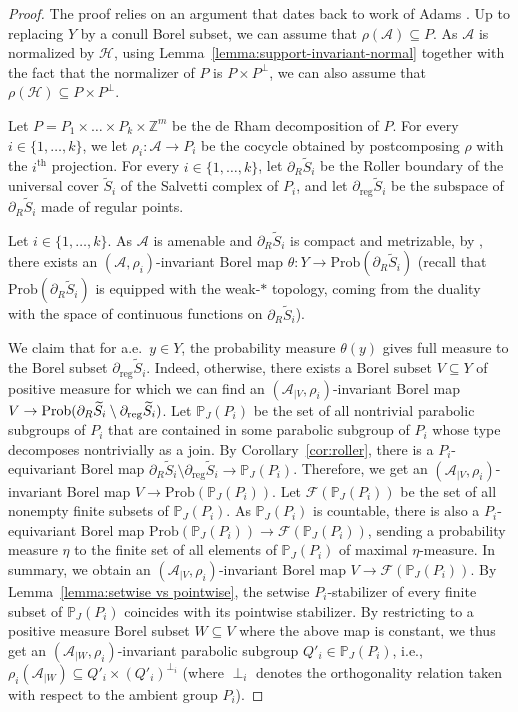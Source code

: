 \documentclass[11pt]{article}
\newcommand{\ie}{i.e.,\xspace}
\numberwithin{equation}{section}
\let\mathcal\mathscr
\theoremstyle{plain}
\theoremstyle{definition}
\newcommand{\cala}{\mathcal{A}}
\newcommand{\calf}{\mathcal{F}}
\newcommand{\calh}{\mathcal{H}}
\newcommand{\Prob}{\mathrm{Prob}}
\newcommand{\reg}{\mathrm{reg}}
\begin{document}
\begin{proof}
The proof relies on an argument that dates back to work of Adams \cite{Ada}. Up to replacing $Y$ by a conull Borel subset, we can assume that $\rho(\cala)\subseteq P$. As $\cala$ is normalized by $\calh$, using Lemma~\ref{lemma:support-invariant-normal} together with the fact that the normalizer of $P$ is $P\times P^{\perp}$, we can also assume that $\rho(\calh)\subseteq P\times P^\perp$.

Let $P=P_1\times\dots\times P_k\times\mathbb{Z}^m$ be the de Rham decomposition of $P$. For every $i\in\{1,\dots,k\}$, we let $\rho_i:\cala\to P_i$ be the cocycle obtained by postcomposing $\rho$ with the $i^{\text{th}}$ projection. For every $i\in\{1,\dots,k\}$, let $\partial_R \widetilde{S}_i$ be the Roller boundary of the universal cover $\widetilde{S}_i$ of the Salvetti complex of $P_i$, and let $\partial_\reg \widetilde{S}_i$ be the subspace of $\partial_R \widetilde{S}_i$ made of regular points.

Let $i\in\{1,\dots,k\}$. As $\cala$ is amenable and $\partial_R \widetilde{S}_i$ is compact and metrizable, by \cite[Prop.\,4.14]{Kid-survey}, there exists an $(\cala,\rho_i)$-invariant Borel map $\theta:Y\to\Prob(\partial_R \widetilde{S}_i)$ (recall that $\Prob(\partial_R\widetilde{S}_i)$ is equipped with the weak-$*$ topology, coming from the duality with the space of continuous functions on $\partial_R\widetilde{S}_i$).

We claim that for a.e.\ $y\in Y$, the probability measure $\theta(y)$ gives full measure to the Borel subset $\partial_\reg \widetilde{S}_i$. Indeed, otherwise, there exists a Borel subset $V\subseteq Y$ of positive measure for which we can find an $(\cala_{|V},\rho_i)$-invariant Borel map $V\to\Prob(\partial_R\widetilde{S}_i\setminus\nobreak\partial_\reg\widetilde{S}_i)$. Let $\mathbb{P}_J(P_i)$ be the set of all nontrivial parabolic subgroups of $P_i$ that are contained in some parabolic subgroup of $P_i$ whose type decomposes nontrivially as a join.
By Corollary~\ref{cor:roller}, there is a $P_i$-equivariant Borel map $\partial_R\widetilde{S}_i\setminus\partial_\reg\widetilde{S}_i\to \mathbb{P}_J(P_i)$. Therefore, we get an $(\cala_{|V},\rho_i)$-invariant Borel map $V\to\Prob(\mathbb{P}_J(P_i))$. Let $\calf(\mathbb{P}_J(P_i))$ be the set of all nonempty finite subsets of $\mathbb{P}_J(P_i)$. As $\mathbb{P}_J(P_i)$ is countable, there is also a $P_i$-equivariant Borel map $\Prob(\mathbb{P}_J(P_i))\to\calf(\mathbb{P}_J(P_i))$, sending a probability measure $\eta$ to the finite set of all elements of $\mathbb{P}_J(P_i)$ of maximal $\eta$-measure. In summary, we obtain an $(\cala_{|V},\rho_i)$-invariant Borel map $V\to\calf(\mathbb{P}_J(P_i))$. By Lemma~\ref{lemma:setwise vs pointwise}, the setwise $P_i$-stabilizer of every finite subset of $\mathbb{P}_J(P_i)$ coincides with its pointwise stabilizer. By restricting to a positive measure Borel subset $W\subseteq V$ where the above map is constant, we thus get an $(\cala_{|W},\rho_i)$-invariant parabolic subgroup $Q'_i\in\mathbb{P}_J(P_i)$, \ie $\rho_i(\cala_{|W})\subseteq Q'_i\times (Q'_i)^{\perp_i}$ (where $\perp_i$ denotes the orthogonality relation taken with respect to the ambient group $P_i$).\enlargethispage{\baselineskip}%


\end{proof}
\end{document}
